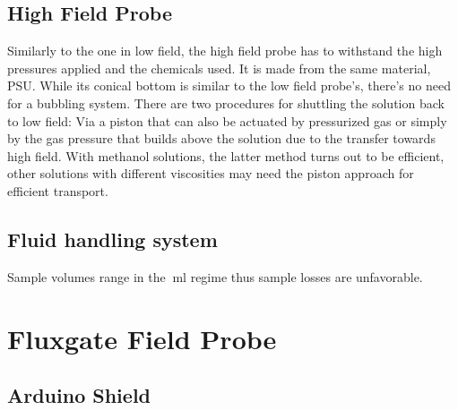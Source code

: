		\subsection{High Field Probe}
			Similarly to the one in low field, the high field probe has to withstand the high
			pressures applied and the chemicals used. It is made from the same material, PSU. While
			its conical bottom is similar to the low field probe's, there's no need for a bubbling
			system. There are two procedures for shuttling the solution back to low field: Via a
			piston that can also be actuated by pressurized gas or simply by the gas pressure that
			builds above the solution due to the transfer towards high field. With methanol
			solutions, the latter method turns out to be efficient, other solutions with different
			viscosities may need the piston approach for efficient transport.
		\subsection{Fluid handling system} 
			Sample volumes range in the $\SI{}{\milli\litre}$ regime thus sample losses are
			unfavorable.
	\section{Fluxgate Field Probe}
		\subsection{Arduino Shield}
%
